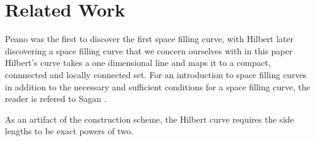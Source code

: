 \section{Related Work}

Peano was the first to discover the first space filling curve, with Hilbert later discovering
a space filling curve that we concern ourselves with in this paper \cite{hilbert2004david}
Hilbert's curve takes a one dimensional line and maps it to a compact, connnected and locally connected
set.
For an introduction to space filling curves in addition to the necessary and sufficient
conditions for a space filling curve, the reader is refered to Sagan \cite{sagan_1994}.

As an artifact of the construction scheme, the Hilbert curve requires the side lengths to be exact powers of two.


%
%
%
%
%
%
%
%
%
%
%
%
%
%
%
